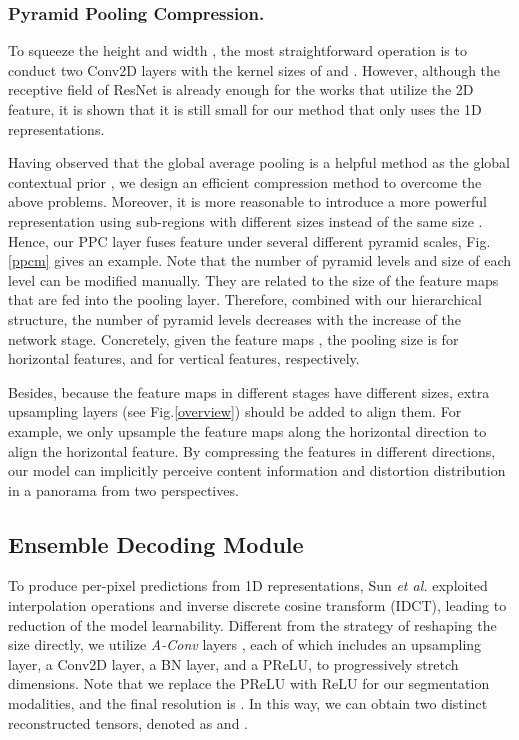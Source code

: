 \documentclass[runningheads]{llncs}
\begin{document}
	
	\subsubsection{Pyramid Pooling Compression.}
	
	To squeeze the height  and width , the most straightforward operation is to conduct two Conv2D layers with the kernel sizes of  and .
	However, although the receptive field of ResNet is already enough for the works that utilize the 2D feature, it is shown that it is still small for our method that only uses the 1D representations. 
	
	
	Having observed that the global average pooling is a helpful method as the global contextual prior \cite{liu2015parsenet}, we design an efficient compression method to overcome the above problems.
	Moreover, it is more reasonable to introduce a more powerful representation using sub-regions with different sizes instead of the same size \cite{zhao2017pyramid}.
	Hence, our PPC layer fuses feature under several different pyramid scales, Fig.\ref{ppcm} gives an example.
	Note that the number of pyramid levels and size of each level can be modified manually. 
	They are related to the size of the feature maps that are fed into the pooling layer.
	Therefore, combined with our hierarchical structure, the number of pyramid levels decreases with the increase of the network stage.
	Concretely, given the feature maps , the pooling size is  for horizontal features, and  for vertical features, respectively.
	
	
	Besides, because the feature maps in different stages have different sizes, extra upsampling layers (see Fig.\ref{overview}) should be added to align them.
	For example, we only upsample the feature maps along the horizontal direction to align the horizontal feature. 
	By compressing the features in different directions, our model can implicitly perceive content information and distortion distribution in a panorama from two perspectives.
	
	
	\subsection{Ensemble Decoding Module} \label{md}
	
	To produce per-pixel predictions from 1D representations, Sun \emph{et al.} \cite{sun2021hohonet} exploited interpolation operations and inverse discrete cosine transform (IDCT), leading to reduction of the model learnability.
	Different from the strategy of reshaping the size directly, we utilize  \emph{A-Conv} layers \cite{pintore2021slicenet}, each of which includes an upsampling layer, a Conv2D layer, a BN layer, and a PReLU, to progressively stretch dimensions.
	Note that we replace the PReLU with ReLU for our segmentation modalities, and the final resolution is . In this way, we can obtain two distinct reconstructed tensors, denoted as  and .
	
\end{document}
